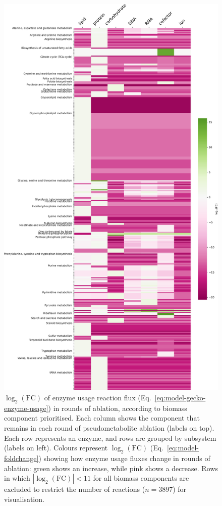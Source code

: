 \begin{figure}
  \centering
  \includegraphics[width=.8\linewidth]{allocation_fc}
  \caption{
    $\log_{2}(\mathrm{FC})$ of enzyme usage reaction flux (Eq.\ \ref{eq:model-gecko-enzyme-usage}) in rounds of ablation, according to biomass component prioritised.
    Each column shows the component that remains in each round of pseudometabolite ablation (labels on top).
    Each row represents an enzyme, and rows are grouped by subsystem (labels on left).
    Colours represent $\log_{2}(\mathrm{FC})$ (Eq.\ \ref{eq:model-foldchange}) showing how enzyme usage fluxes change in rounds of ablation: green shows an increase, while pink shows a decrease.
    Rows in which $|\log_{2}(\mathrm{FC})| < 11$ for all biomass components are excluded to restrict the number of reactions ($n = \num{3897}$) for visualisation.
  }
  \label{fig:model-ablate-enz-use}
\end{figure}


